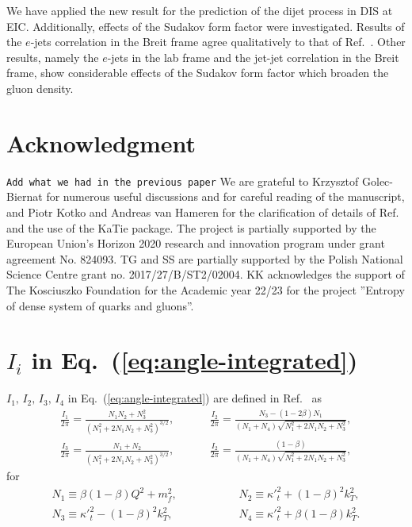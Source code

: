 \documentclass[11pt]{article}
\numberwithin{equation}{section}
\numberwithin{table}{section}
\numberwithin{figure}{section}
\newcommand{\comment}[1]{\texttt{\color{red}#1}}
\begin{document}
We have applied the new result for the prediction of the dijet process in DIS at EIC. Additionally, effects of the Sudakov form factor were investigated. Results of the $e$-jets correlation in the Breit frame agree qualitatively to that of Ref.~\cite{vanHameren:2021sqc}. Other results, namely the $e$-jets in the lab frame and the jet-jet correlation in the Breit frame, show considerable effects of the Sudakov form factor which broaden the gluon density.  


\section*{Acknowledgment}
\comment{Add what we had in the previous paper}
We are grateful to Krzysztof Golec-Biernat for numerous useful discussions and for careful reading of the manuscript, and Piotr Kotko and Andreas van Hameren for the clarification of details of Ref.~\cite{vanHameren:2021sqc} and the use of the KaTie package. The project is partially supported by 
the European Union’s Horizon 2020 research and innovation program under grant agreement No. 824093.
TG and SS are partially supported by the Polish National Science Centre grant no. 2017/27/B/ST2/02004.
KK acknowledges the support of The Kosciuszko Foundation for the Academic year 22/23 for the
project ”Entropy of dense system of quarks and gluons”.%


\appendix
\section{$I_i$ in Eq.~(\ref{eq:angle-integrated})}
$I_1,\, I_2,\,  I_3,\,  I_4$ in Eq.~(\ref{eq:angle-integrated}) are defined in Ref.~\cite{Kimber:2001uaa} as
\begin{equation}
	\begin{split}
		\frac{I_1}{2\pi}=\frac{N_1N_2+N_3^2}{\left( N^2_1+2N_1N_2+N_3^2\right)^{3/2}}, &\hspace{1cm}
		\frac{I_2}{2\pi}=\frac{N_3-(1-2\beta)N_1}{(N_1+N_4)\sqrt{ N^2_1+2N_1N_2+N_3^2}},\\
		\frac{I_3}{2\pi}=\frac{N_1+N_2}{\left( N^2_1+2N_1N_2+N_3^2\right)^{3/2}},&\hspace{1cm}
		\frac{I_2}{2\pi}=\frac{(1-\beta)}{(N_1+N_4)\sqrt{ N^2_1+2N_1N_2+N_3^2}},
	\end{split}
\end{equation}
for
\begin{equation}
	\begin{split}
		N_1\equiv\beta(1-\beta)Q^2+m_f^2, &\hspace{2cm}
		N_2\equiv{\kappa'}_t^2+(1-\beta)^2k_T^2,\\
		N_3\equiv{\kappa'}_t^2-(1-\beta)^2k_T^2, &\hspace{2cm}
		N_4\equiv{\kappa'}_t^2+\beta(1-\beta)k_T^2.
	\end{split}
\end{equation}
\end{document}
